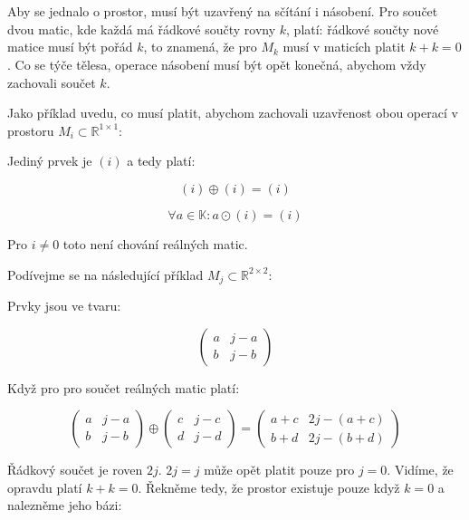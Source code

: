\documentclass[10pt,a4paper]{article}
\begin{document}
\section{}
Aby se jednalo o prostor, musí být uzavřený na sčítání i násobení. Pro součet dvou matic, kde každá má řádkové součty rovny $k$, platí: řádkové součty nové matice musí být pořád $k$, to znamená, že pro $M_k$ musí v maticích platit $k+k=0$. Co se týče tělesa, operace násobení musí být opět konečná, abychom vždy zachovali součet $k$.

Jako příklad uvedu, co musí platit, abychom zachovali uzavřenost obou operací v prostoru $M_i \subset \mathbb{R}^{1 \times 1}$:

Jediný prvek je $(i)$ a tedy platí:

\begin{equation*}
(i) \oplus (i) = (i)
\end{equation*}

\begin{equation*}
\forall a \in \mathbb{K}: a \odot (i) = (i)
\end{equation*}

Pro $i \neq 0$ toto není chování reálných matic.

Podívejme se na následující příklad $M_j \subset \mathbb{R}^{2 \times 2}$:

Prvky jsou ve tvaru:

\begin{equation*}
\begin{pmatrix}
a & j - a\\
b & j - b
\end{pmatrix}
\end{equation*}

Když pro pro součet reálných matic platí:

\begin{equation*}
\begin{pmatrix}
a & j - a\\
b & j - b
\end{pmatrix} \oplus
\begin{pmatrix}
c & j - c\\
d & j - d
\end{pmatrix} =
\begin{pmatrix}
a+c & 2j - (a + c)\\
b+d & 2j - (b + d)
\end{pmatrix}
\end{equation*}

Řádkový součet je roven $2j$. $2j = j$ může opět platit pouze pro $j = 0$. Vidíme, že opravdu platí $k+k=0$. Řekněme tedy, že prostor existuje pouze když $k = 0$ a nalezněme jeho bázi:
\end{document}
